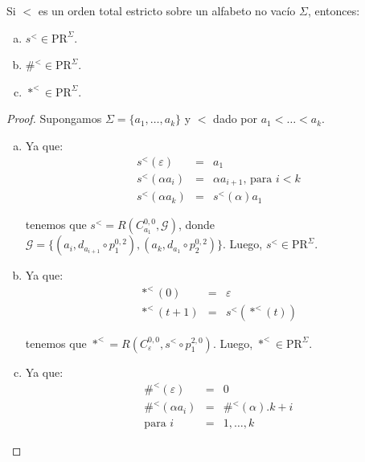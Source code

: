   \begin{lemma}
    \par Si $<$ es un orden total estricto sobre un alfabeto no vacío $\Sigma$, entonces:

    \begin{enumerate}[a)]
      \item $s^{<} \in \mathrm{PR}^{\Sigma}$.
      \item $\#^{<} \in \mathrm{PR}^{\Sigma}$.
      \item $\ast^{<} \in \mathrm{PR}^{\Sigma}$.
    \end{enumerate}
  \end{lemma}
  \begin{proof}
    \par Supongamos $\Sigma = \{a_{1}, \dotsc, a_{k}\}$ y $<$ dado por $a_{1} < \dotsc < a_{k}$.

    \begin{enumerate}[a)]
      \item Ya que:
        \begin{eqnarray}
          \nonumber s^{<}(\varepsilon) &=& a_{1} \\
          \nonumber s^{<}(\alpha a_{i}) &=& \alpha a_{i+1} \text{, para } i < k \\
          \nonumber s^{<}(\alpha a_{k}) &=& s^{<}(\alpha) a_{1}
        \end{eqnarray}

        \par tenemos que $s^{<} = R(C_{a_{1}}^{0, 0}, \mathcal{G})$, donde $\mathcal{G} = \{\left(a_{i}, d_{a_{i+1}}
        \circ p_{1}^{0,2} \right), \left(a_{k}, d_{a_{1}} \circ p_{2}^{0,2} \right)\}$. Luego, $s^{<} \in
        \mathrm{PR}^{\Sigma}$.

      \item Ya que:
        \begin{eqnarray}
          \nonumber \ast^{<}(0) &=& \varepsilon \\
          \nonumber \ast^{<}(t+1) &=& s^{<}(\ast^{<}(t))
        \end{eqnarray}

        \par tenemos que $\ast^{<} = R(C_{\varepsilon}^{0,0}, s^{<} \circ p_{1}^{2,0})$. Luego, $\ast^{<} \in
        \mathrm{PR}^{\Sigma}$.

      \item Ya que:
        \begin{eqnarray}
          \nonumber \#^{<}(\varepsilon) &=& 0 \\
          \nonumber \#^{<}(\alpha a_{i}) &=& \#^{<}(\alpha). k + i \\
          \nonumber \text{para } i &=& 1, \dotsc, k
        \end{eqnarray}


\end{enumerate}
\end{proof}

